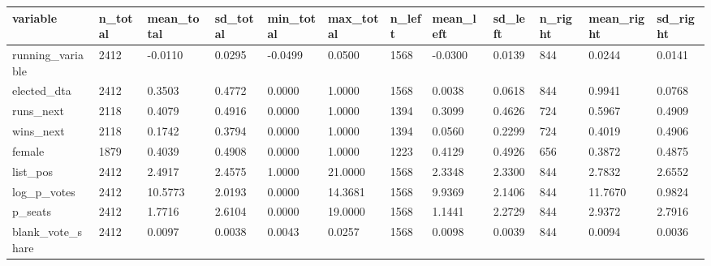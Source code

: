 \begin{tabular}{llllllllllll}
\toprule
variable & n\_total & mean\_total & sd\_total & min\_total & max\_total & n\_left & mean\_left & sd\_left & n\_right & mean\_right & sd\_right \\
\midrule
running\_variable & 2412 & -0.0110 & 0.0295 & -0.0499 & 0.0500 & 1568 & -0.0300 & 0.0139 & 844 & 0.0244 & 0.0141 \\
elected\_dta & 2412 & 0.3503 & 0.4772 & 0.0000 & 1.0000 & 1568 & 0.0038 & 0.0618 & 844 & 0.9941 & 0.0768 \\
runs\_next & 2118 & 0.4079 & 0.4916 & 0.0000 & 1.0000 & 1394 & 0.3099 & 0.4626 & 724 & 0.5967 & 0.4909 \\
wins\_next & 2118 & 0.1742 & 0.3794 & 0.0000 & 1.0000 & 1394 & 0.0560 & 0.2299 & 724 & 0.4019 & 0.4906 \\
female & 1879 & 0.4039 & 0.4908 & 0.0000 & 1.0000 & 1223 & 0.4129 & 0.4926 & 656 & 0.3872 & 0.4875 \\
list\_pos & 2412 & 2.4917 & 2.4575 & 1.0000 & 21.0000 & 1568 & 2.3348 & 2.3300 & 844 & 2.7832 & 2.6552 \\
log\_p\_votes & 2412 & 10.5773 & 2.0193 & 0.0000 & 14.3681 & 1568 & 9.9369 & 2.1406 & 844 & 11.7670 & 0.9824 \\
p\_seats & 2412 & 1.7716 & 2.6104 & 0.0000 & 19.0000 & 1568 & 1.1441 & 2.2729 & 844 & 2.9372 & 2.7916 \\
blank\_vote\_share & 2412 & 0.0097 & 0.0038 & 0.0043 & 0.0257 & 1568 & 0.0098 & 0.0039 & 844 & 0.0094 & 0.0036 \\
\bottomrule
\end{tabular}
